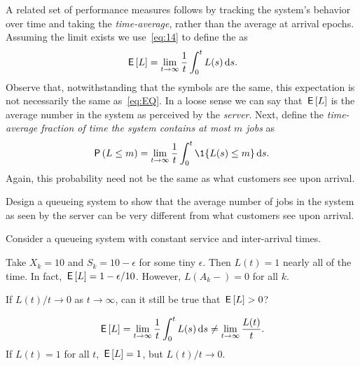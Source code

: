 A related set of performance measures follows by tracking the system's behavior over time and taking the \emph{time-average}, rather than the average at arrival epochs.
Assuming the limit exists we use~\cref{eq:14} to define the  as
\begin{equation}
 \label{eq:46}
 \,\mathsf{E}\left[L\right] = \lim_{t\to\infty} \frac 1 t\int_0^t L(s) \,\text{d}s.
\end{equation}
Observe that, notwithstanding that the symbols are the same, this expectation is not necessarily the same as~\cref{eq:EQ}.
In a loose sense we can say that $\,\mathsf{E}\left[L\right]$ is the average number in the system as perceived by the \emph{server}.
Next, define the \emph{time-average fraction of time the system contains at most $m$ jobs} as
\begin{equation}
 \label{eq:47}
 \P{L\leq m} =\lim_{t\to\infty} \frac 1 t\int_0^t \1{L(s)\leq m} \d s.
\end{equation}
Again, this probability need not be the same as what customers see upon arrival.


\begin{exercise}
Design a queueing system to show that the average number of jobs in the system as seen by the server can be very different from what customers see upon arrival.
\begin{hint}
Consider a queueing system with constant service and inter-arrival times.
\end{hint}
\begin{solution}
 Take $X_k = 10$ and $S_k = 10-\epsilon$ for some tiny
 $\epsilon$. Then $L(t) = 1$ nearly all of the time. In fact,
 $\,\mathsf{E}\left[L\right] = 1-\epsilon/10$. However, $L(A_k-)=0$ for all $k$.
\end{solution}
\end{exercise}


\begin{extra}
 If $L(t)/t \to 0$ as $t\to\infty$, can it still be true that $\,\mathsf{E}\left[L\right]>0$? 
\begin{solution}
 \begin{equation*}
 \,\mathsf{E}\left[L\right] = \lim_{t\to\infty} \frac 1 t \int_0^t L(s) \,\text{d}s \neq \lim_{t\to\infty} \frac{L(t)}t.
 \end{equation*}
If $L(t)=1$ for all $t$, $\,\mathsf{E}\left[L\right] =1 $, but $L(t)/t \to 0$. 
\end{solution}
\end{extra}

